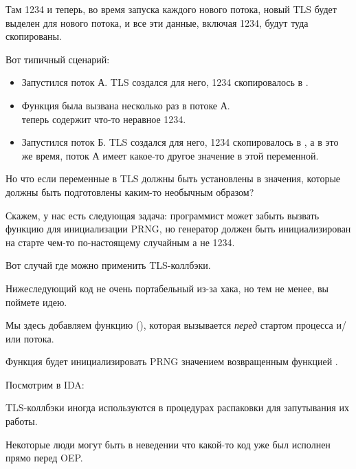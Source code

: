 Там 1234 и теперь, во время запуска каждого нового потока, новый \ac{TLS} будет выделен для нового потока,
и все эти данные, включая 1234, будут туда скопированы.

Вот типичный сценарий:

\begin{itemize}
\item Запустился поток А. \ac{TLS} создался для него, 1234 скопировалось в .

\item Функция  была вызвана несколько раз в потоке А. \\
 теперь содержит что-то неравное 1234.

\item Запустился поток Б. \ac{TLS} создался для него, 1234 скопировалось в , 
а в это же время, поток А имеет какое-то другое значение в этой переменной.
\end{itemize}


Но что если переменные в \ac{TLS} должны быть установлены в значения, которые должны быть подготовлены
каким-то необычным образом?

Скажем, у нас есть следующая задача:
программист может забыть вызвать функцию  для инициализации \ac{PRNG}, но генератор должен быть
инициализирован на старте чем-то по-настоящему случайным а не 1234.

Вот случай где можно применить \ac{TLS}-коллбэки.

Нижеследующий код не очень портабельный из-за хака, но тем не менее, вы поймете идею.

Мы здесь добавляем функцию (), которая вызывается \emph{перед} стартом процесса и/или потока.

Функция будет инициализировать \ac{PRNG} значением возвращенным функцией .



Посмотрим в IDA:



TLS-коллбэки иногда используются в процедурах распаковки для запутывания их работы.

Некоторые люди могут быть в неведении что какой-то код уже был исполнен прямо перед \ac{OEP}.

